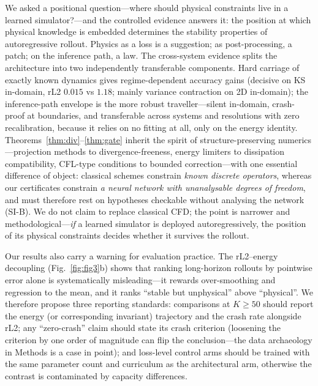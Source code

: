 \documentclass[11pt,a4paper]{article}
\begin{document}
We asked a positional question---where should physical constraints live in a learned simulator?---and the controlled evidence answers it: the position at which physical knowledge is embedded determines the stability properties of autoregressive rollout. Physics as a loss is a suggestion; as post-processing, a patch; on the inference path, a law. The cross-system evidence splits the architecture into two independently transferable components. Hard carriage of exactly known dynamics gives regime-dependent accuracy gains (decisive on KS in-domain, rL2 $0.015$ vs $1.18$; mainly variance contraction on 2D in-domain); the inference-path envelope is the more robust traveller---silent in-domain, crash-proof at boundaries, and transferable across systems and resolutions with zero recalibration, because it relies on no fitting at all, only on the energy identity. Theorems~\ref{thm:div}--\ref{thm:gate} inherit the spirit of structure-preserving numerics\cite{hairer2006gni,chorin1968}---projection methods to divergence-freeness, energy limiters to dissipation compatibility, CFL-type conditions to bounded correction---with one essential difference of object: classical schemes constrain \emph{known discrete operators}, whereas our certificates constrain \emph{a neural network with unanalysable degrees of freedom}, and must therefore rest on hypotheses checkable without analysing the network (SI-B). We do not claim to replace classical CFD; the point is narrower and methodological---\emph{if} a learned simulator is deployed autoregressively, the position of its physical constraints decides whether it survives the rollout.

Our results also carry a warning for evaluation practice. The rL2--energy decoupling (Fig.~\ref{fig:fig3}b) shows that ranking long-horizon rollouts by pointwise error alone is systematically misleading---it rewards over-smoothing and regression to the mean, and it ranks ``stable but unphysical'' above ``physical''. We therefore propose three reporting standards: comparisons at $K\ge50$ should report the energy (or corresponding invariant) trajectory and the crash rate alongside rL2; any ``zero-crash'' claim should state its crash criterion (loosening the criterion by one order of magnitude can flip the conclusion---the data archaeology in Methods is a case in point); and loss-level control arms should be trained with the same parameter count and curriculum as the architectural arm, otherwise the contrast is contaminated by capacity differences.
\end{document}
